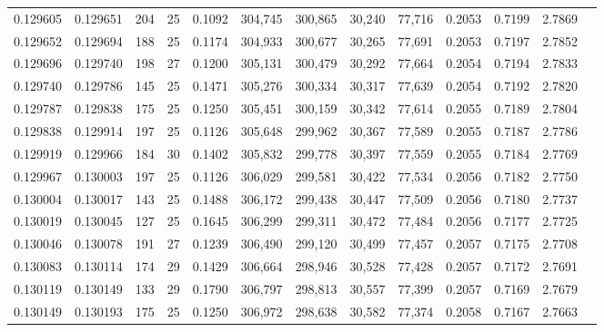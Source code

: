 \begin{tabular}{rrrrrrrrrrrrr}
0.129605 & 0.129651 & 204 &  25 &                                     0.1092 & 304,745 & 300,865 &  30,240 &  77,716 & 0.2053 & 0.7199 & 2.7869 \\
0.129652 & 0.129694 & 188 &  25 &                                     0.1174 & 304,933 & 300,677 &  30,265 &  77,691 & 0.2053 & 0.7197 & 2.7852 \\
0.129696 & 0.129740 & 198 &  27 &                                     0.1200 & 305,131 & 300,479 &  30,292 &  77,664 & 0.2054 & 0.7194 & 2.7833 \\
0.129740 & 0.129786 & 145 &  25 &                                     0.1471 & 305,276 & 300,334 &  30,317 &  77,639 & 0.2054 & 0.7192 & 2.7820 \\
0.129787 & 0.129838 & 175 &  25 &                                     0.1250 & 305,451 & 300,159 &  30,342 &  77,614 & 0.2055 & 0.7189 & 2.7804 \\
0.129838 & 0.129914 & 197 &  25 &                                     0.1126 & 305,648 & 299,962 &  30,367 &  77,589 & 0.2055 & 0.7187 & 2.7786 \\
0.129919 & 0.129966 & 184 &  30 &                                     0.1402 & 305,832 & 299,778 &  30,397 &  77,559 & 0.2055 & 0.7184 & 2.7769 \\
0.129967 & 0.130003 & 197 &  25 &                                     0.1126 & 306,029 & 299,581 &  30,422 &  77,534 & 0.2056 & 0.7182 & 2.7750 \\
0.130004 & 0.130017 & 143 &  25 &                                     0.1488 & 306,172 & 299,438 &  30,447 &  77,509 & 0.2056 & 0.7180 & 2.7737 \\
0.130019 & 0.130045 & 127 &  25 &                                     0.1645 & 306,299 & 299,311 &  30,472 &  77,484 & 0.2056 & 0.7177 & 2.7725 \\
0.130046 & 0.130078 & 191 &  27 &                                     0.1239 & 306,490 & 299,120 &  30,499 &  77,457 & 0.2057 & 0.7175 & 2.7708 \\
0.130083 & 0.130114 & 174 &  29 &                                     0.1429 & 306,664 & 298,946 &  30,528 &  77,428 & 0.2057 & 0.7172 & 2.7691 \\
0.130119 & 0.130149 & 133 &  29 &                                     0.1790 & 306,797 & 298,813 &  30,557 &  77,399 & 0.2057 & 0.7169 & 2.7679 \\
0.130149 & 0.130193 & 175 &  25 &                                     0.1250 & 306,972 & 298,638 &  30,582 &  77,374 & 0.2058 & 0.7167 & 2.7663 \\

\end{tabular}
